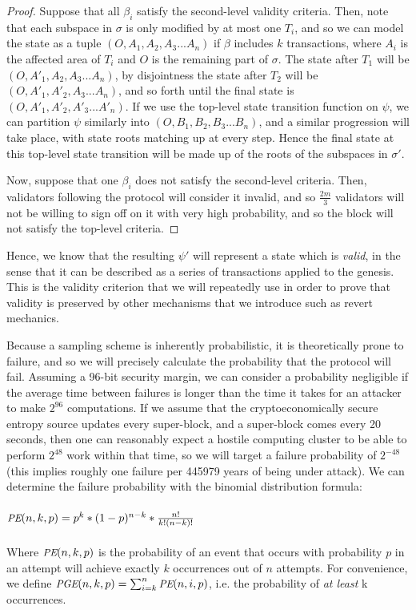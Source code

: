 \documentclass[11pt,a4paper]{article}
\makeatletter
\theoremstyle{plain}
\theoremstyle{definition}
\theoremstyle{remark}
\newcommand{\ie}{i.e.\@\xspace}
\newcommand{\makeintoafunction}[1]{\textit{\uppercase{\small #1}}}
\newcommand{\PGE}{\makeintoafunction{pge}}
\newcommand{\PE}{\makeintoafunction{pe}}
\makeatother
\begin{document}
\begin{proof}
Suppose that all $\beta_i$ satisfy the second-level validity criteria. Then, note that each subspace in $\sigma$ is only modified by at most one $T_i$, and so we can model the state as a tuple $(O, A_1, A_2, A_3 ... A_n)$ if $\beta$ includes $k$ transactions, where $A_i$ is the affected area of $T_i$ and $O$ is the remaining part of $\sigma$. The state after $T_1$ will be $(O, A'_1, A_2, A_3 ... A_n)$, by disjointness the state after $T_2$ will be $(O, A'_1, A'_2, A_3 ... A_n)$, and so forth until the final state is $(O, A'_1, A'_2, A'_3 ... A'_n)$. If we use the top-level state transition function on $\psi$, we can partition $\psi$ similarly into $(O, B_1, B_2, B_3 ... B_n)$, and a similar progression will take place, with state roots matching up at every step. Hence the final state at this top-level state transition will be made up of the roots of the subspaces in $\sigma'$.

Now, suppose that one $\beta_i$ does not satisfy the second-level criteria. Then, validators following the protocol will consider it invalid, and so $\frac{2m}{3}$ validators will not be willing to sign off on it with very high probability, and so the block will not satisfy the top-level criteria.
\end{proof}

Hence, we know that the resulting $\psi'$ will represent a state which is \emph{valid}, in the sense that it can be described as a series of transactions applied to the genesis. This is the validity criterion that we will repeatedly use in order to prove that validity is preserved by other mechanisms that we introduce such as revert mechanics.

Because a sampling scheme is inherently probabilistic, it is theoretically prone to failure, and so we will precisely calculate the probability that the protocol will fail. Assuming a 96-bit security margin, we can consider a probability negligible if the average time between failures is longer than the time it takes for an attacker to make $2^{96}$ computations. If we assume that the cryptoeconomically secure entropy source updates every super-block, and a super-block comes every 20 seconds, then one can reasonably expect a hostile computing cluster to be able to perform $2^{48}$ work within that time, so we will target a failure probability of $2^{-48}$ (this implies roughly one failure per 445979 years of being under attack). We can determine the failure probability with the binomial distribution formula:
\\
\\
$\PE(n, k, p) = p^k * (1-p)^{n-k} * \frac{n!}{k!(n-k)!}$
\\
\\
Where $\PE(n, k, p)$ is the probability of an event that occurs with probability $p$ in an attempt will achieve exactly $k$ occurrences out of $n$ attempts. For convenience, we define $\PGE(n, k, p) = \sum_{i=k}^n \PE(n, i, p)$, \ie the probability of \emph{at least} k occurrences.
\end{document}
